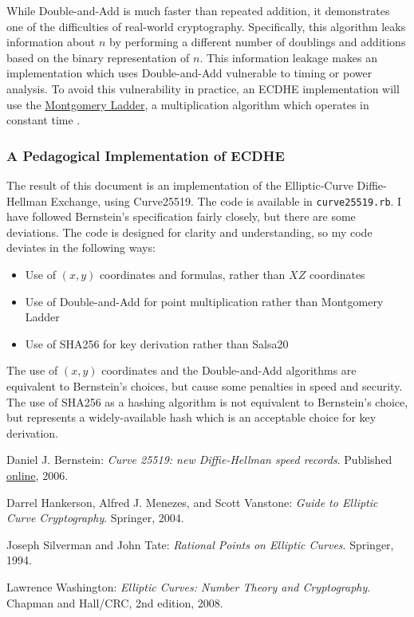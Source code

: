 \documentclass{article}
\begin{document}
While Double-and-Add is much faster than repeated addition, it demonstrates one of the difficulties of real-world cryptography.
Specifically, this algorithm leaks information about $n$ by performing a different number of doublings and additions based on the binary representation of $n$.
This information leakage makes an implementation which uses Double-and-Add vulnerable to timing or power analysis.
To avoid this vulnerability in practice, an ECDHE implementation will use the \href{http://safecurves.cr.yp.to/ladder.html}{Montgomery Ladder}, a multiplication algorithm which operates in constant time \cite[\S 3.3]{ecc-guide}. 

\subsubsection{A Pedagogical Implementation of ECDHE}
The result of this document is an implementation of the Elliptic-Curve Diffie-Hellman Exchange, using Curve25519.
The code is available in \texttt{curve25519.rb}.
I have followed Bernstein's specification fairly closely, but there are some deviations.
The code is designed for clarity and understanding, so my code deviates in the following ways:
\begin{itemize}
\item Use of $(x,y)$ coordinates and formulas, rather than $XZ$ coordinates
\item Use of Double-and-Add for point multiplication rather than Montgomery Ladder
\item Use of SHA256 for key derivation rather than Salsa20
\end{itemize}

The use of $(x,y)$ coordinates and the Double-and-Add algorithms are equivalent to Bernstein's choices, but cause some penalties in speed and security.
The use of SHA256 as a hashing algorithm is not equivalent to Bernstein's choice, but represents a widely-available hash which is an acceptable choice for key derivation.

\clearpage

\begin{thebibliography}{9}

	Daniel J. Bernstein:
	\emph{Curve 25519: new Diffie-Hellman speed records}.
	Published \href{http://cr.yp.to/ecdh/curve25519-20060209.pdf}{online},
	2006.

	Darrel Hankerson, Alfred J. Menezes, and Scott Vanstone:
	\emph{Guide to Elliptic Curve Cryptography}.
	Springer,
	2004.

	Joseph Silverman and John Tate:
	\emph{Rational Points on Elliptic Curves}.
	Springer,
	1994.

	Lawrence Washington:
	\emph{Elliptic Curves: Number Theory and Cryptography}.
	Chapman and Hall/CRC,
	2nd edition,
	2008.

\end{thebibliography}
\end{document}
